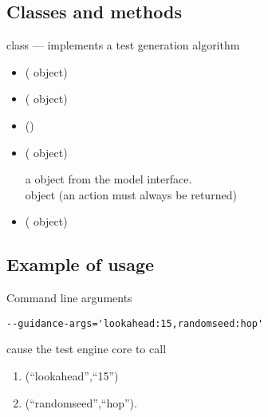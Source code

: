 \documentclass{article}
\begin{document}
\subsection{Classes and methods}

\noindent{} class --- implements a test generation
algorithm
\begin{itemize}
\item[] ( object)
  \begin{quot}
  \end{quot}
\item[] ( object)
  \begin{quot}
  \end{quot}
\item[] ()
  \begin{quot}
  \end{quot}
\item[] ( object)
  \begin{quot}
     a  object from the model interface.\\
      object (an action must always be returned)\\
  \end{quot}
\item[] ( object)
  \begin{quot}
  \end{quot}
\end{itemize}


\subsection{Example of usage}

Command line arguments
\begin{verbatim}
--guidance-args='lookahead:15,randomseed:hop'
\end{verbatim}

cause the test engine core to call
\begin{enumerate}
\item {}(``lookahead'',``15'')
\item {}(``randomseed'',``hop'').
\end{enumerate}
\end{document}
